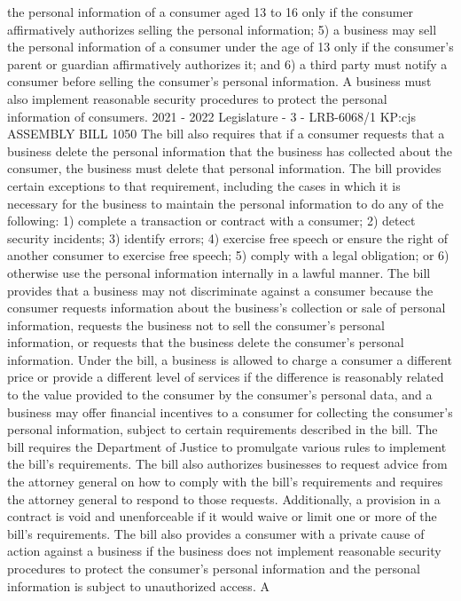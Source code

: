 the personal information of a consumer aged 13 to 16 only if the consumer
affirmatively authorizes selling the personal information; 5) a business may sell the
personal information of a consumer under the age of 13 only if the consumer's parent
or guardian affirmatively authorizes it; and 6) a third party must notify a consumer
before selling the consumer's personal information. A business must also implement
reasonable security procedures to protect the personal information of consumers.
2021 - 2022 Legislature - 3 - LRB-6068/1
KP:cjs
 ASSEMBLY BILL 1050
The bill also requires that if a consumer requests that a business delete the
personal information that the business has collected about the consumer, the
business must delete that personal information. The bill provides certain exceptions
to that requirement, including the cases in which it is necessary for the business to
maintain the personal information to do any of the following: 1) complete a
transaction or contract with a consumer; 2) detect security incidents; 3) identify
errors; 4) exercise free speech or ensure the right of another consumer to exercise free
speech; 5) comply with a legal obligation; or 6) otherwise use the personal
information internally in a lawful manner.
The bill provides that a business may not discriminate against a consumer
because the consumer requests information about the business's collection or sale of
personal information, requests the business not to sell the consumer's personal
information, or requests that the business delete the consumer's personal
information. Under the bill, a business is allowed to charge a consumer a different
price or provide a different level of services if the difference is reasonably related to
the value provided to the consumer by the consumer's personal data, and a business
may offer financial incentives to a consumer for collecting the consumer's personal
information, subject to certain requirements described in the bill.
The bill requires the Department of Justice to promulgate various rules to
implement the bill's requirements. The bill also authorizes businesses to request
advice from the attorney general on how to comply with the bill's requirements and
requires the attorney general to respond to those requests.
Additionally, a provision in a contract is void and unenforceable if it would
waive or limit one or more of the bill's requirements. The bill also provides a
consumer with a private cause of action against a business if the business does not
implement reasonable security procedures to protect the consumer's personal
information and the personal information is subject to unauthorized access. A
